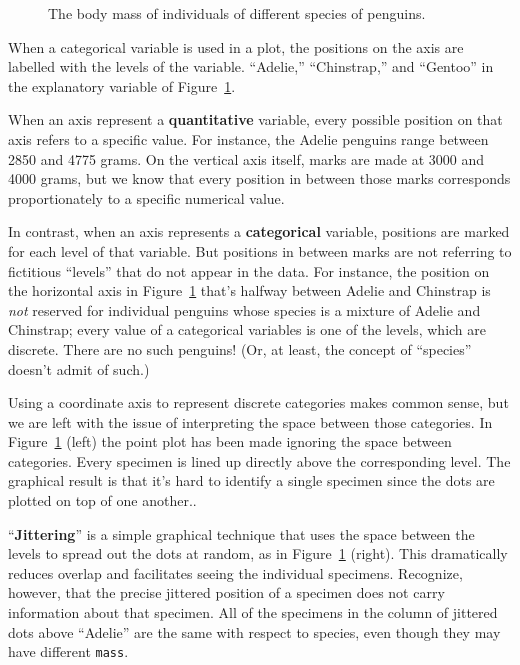 \documentclass[
  letterpaper,
  DIV=11,
  numbers=noendperiod,
  oneside]{scrartcl}
\begin{document}
\begin{figure}
{\begin{figure}[H]
\begin{minipage}{0.50\linewidth}
\end{minipage}%

\end{figure}%

}

\caption{\label{fig-mass-species}The body mass of individuals of
different species of penguins.}

\end{figure}%

When a categorical variable is used in a plot, the positions on the axis
are labelled with the levels of the variable. ``Adelie,'' ``Chinstrap,''
and ``Gentoo'' in the explanatory variable of
Figure~\ref{fig-mass-species}.

When an axis represent a \textbf{quantitative} variable, every possible
position on that axis refers to a specific value. For instance, the
Adelie penguins range between 2850 and 4775 grams. On the vertical axis
itself, marks are made at 3000 and 4000 grams, but we know that every
position in between those marks corresponds proportionately to a
specific numerical value.

In contrast, when an axis represents a \textbf{categorical} variable,
positions are marked for each level of that variable. But positions in
between marks are not referring to fictitious ``levels'' that do not
appear in the data. For instance, the position on the horizontal axis in
Figure~\ref{fig-mass-species} that's halfway between Adelie and
Chinstrap is \emph{not} reserved for individual penguins whose species
is a mixture of Adelie and Chinstrap; every value of a categorical
variables is one of the levels, which are discrete. There are no such
penguins! (Or, at least, the concept of ``species'' doesn't admit of
such.)

Using a coordinate axis to represent discrete categories makes common
sense, but we are left with the issue of interpreting the space between
those categories. In Figure~\ref{fig-mass-species} (left) the point plot
has been made ignoring the space between categories. Every specimen is
lined up directly above the corresponding level. The graphical result is
that it's hard to identify a single specimen since the dots are plotted
on top of one another..

``\textbf{Jittering}'' is a simple graphical technique that uses the
space between the levels to spread out the dots at random, as in
Figure~\ref{fig-mass-species} (right). This dramatically reduces overlap
and facilitates seeing the individual specimens. Recognize, however,
that the precise jittered position of a specimen does not carry
information about that specimen. All of the specimens in the column of
jittered dots above ``Adelie'' are the same with respect to species,
even though they may have different \texttt{mass}.
\end{document}
